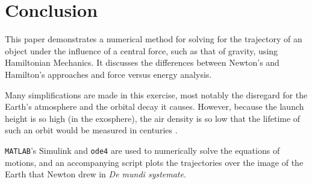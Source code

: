 \documentclass[aps,twocolumn]{revtex4-1}
\begin{document}
\section{Conclusion}
This paper demonstrates a numerical method for solving for the trajectory of an object under the influence of a central force, such as that of gravity, using Hamiltonian Mechanics. It discusses the differences between Newton's and Hamilton's approaches and force versus energy analysis.

Many simplifications are made in this exercise, most notably the disregard for the Earth's atmosphere and the orbital decay it causes. However, because the launch height is so high (in the exosphere), the air density is so low that the lifetime of such an orbit would be measured in centuries \cite{nasaDecay}.

\verb|MATLAB|'s Simulink and \verb|ode4| are used to numerically solve the equations of motions, and an accompanying script plots the trajectories over the image of the Earth that Newton drew in \textit{De mundi systemate}.


\newpage
\appendix  
\end{document}
